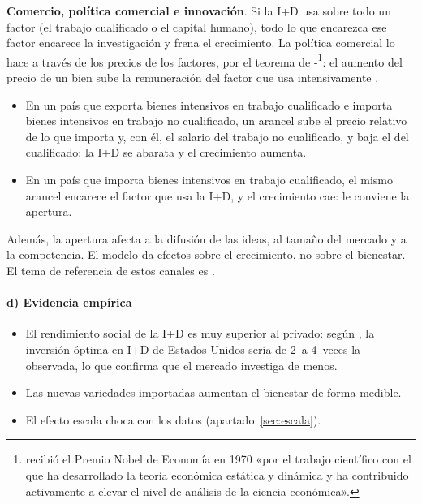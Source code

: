 \documentclass[11pt]{article}
\begin{document}
\begin{anotaciones}
\textbf{Comercio, política comercial e innovación}\nocite{GrossmanHelpman1991}. Si la I+D usa sobre todo un factor (el trabajo cualificado o el capital humano), todo lo que encarezca ese factor encarece la investigación y frena el crecimiento. La política comercial lo hace a través de los precios de los factores, por el teorema de -\footnote{ recibió el Premio Nobel de Economía en 1970 «por el trabajo científico con el que ha desarrollado la teoría económica estática y dinámica y ha contribuido activamente a elevar el nivel de análisis de la ciencia económica»\nocite{Nobel1970Samuelson}.}: el aumento del precio de un bien sube la remuneración del factor que usa intensivamente .
\begin{itemize}
\item En un país que exporta bienes intensivos en trabajo cualificado e importa bienes intensivos en trabajo no cualificado, un arancel sube el precio relativo de lo que importa y, con él, el salario del trabajo no cualificado, y baja el del cualificado: la I+D se abarata y el crecimiento aumenta.
\item En un país que importa bienes intensivos en trabajo cualificado, el mismo arancel encarece el factor que usa la I+D, y el crecimiento cae: le conviene la apertura.
\end{itemize}
Además, la apertura afecta a la difusión de las ideas, al tamaño del mercado y a la competencia. El modelo da efectos sobre el crecimiento, no sobre el bienestar. El tema de referencia de estos canales es .
\end{anotaciones}

\paragraph{d) Evidencia empírica}

\begin{itemize}
\item El rendimiento social de la I+D es muy superior al privado: según \textcite{JonesWilliams1998Measuring}, la inversión óptima en I+D de Estados Unidos sería de 2~a 4~veces la observada, lo que confirma que el mercado investiga de menos.
\item Las nuevas variedades importadas aumentan el bienestar de forma medible\nocite{BrodaWeinstein2006Globalization}.
\item El efecto escala choca con los datos (apartado~\ref{sec:escala}).
\end{itemize}
\end{document}
